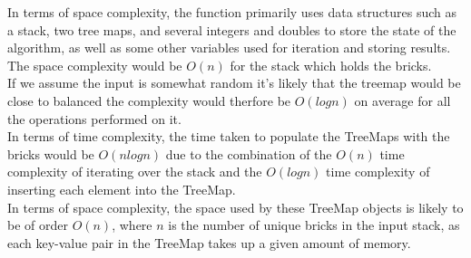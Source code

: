 \documentclass[a4paper]{article}
\begin{document}
In terms of space complexity, the function primarily uses data structures such as
a stack, two tree maps, and several integers and doubles to store the state of the algorithm,
as well as some other variables used for iteration and storing results.
The space complexity would be $O(n)$ for the stack which holds the bricks. \\

If we assume the input is somewhat random it's likely that the treemap
would be close to balanced the complexity would therfore be $O(log n)$ on average for all the operations performed on it. \\

In terms of time complexity, the time taken to populate the TreeMaps 
with the bricks would be $O(n log n)$ due to the combination of the $O(n)$ time complexity of iterating over the stack
and the $O(log n)$ time complexity of inserting each element into the TreeMap. \\

In terms of space complexity, the space used by these TreeMap objects is likely to be of order $O(n)$,
where $n$ is the number of unique bricks in the input stack, as each key-value pair in the TreeMap takes up a given amount of memory. \\
\begin{verbatim}
 \end{verbatim}









\end{document}
